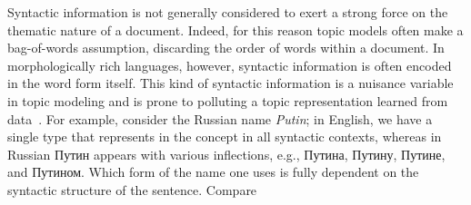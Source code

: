 \documentclass{clv2}
\begin{document}
Syntactic information is not generally considered to exert a strong
force on the thematic nature of a document.  Indeed, for this reason
topic models often make a bag-of-words assumption, discarding the order
of words within a document.  In morphologically rich languages,
however, syntactic information is often encoded in the word form
itself.  This kind of syntactic information is a nuisance variable
in topic modeling and is prone to polluting a topic representation
learned from data~\cite{boydgraber2014}.
For example, consider the Russian name
{\em Putin}; in English, we have a single type that represents in the
concept in all syntactic contexts, whereas in Russian
{ Путин} appears with various inflections,
e.g., {Путина},
{Путину}, {Путине},
and {Путином}. Which form of the name one uses
is fully dependent on the syntactic structure of the sentence. Compare
\end{document}
